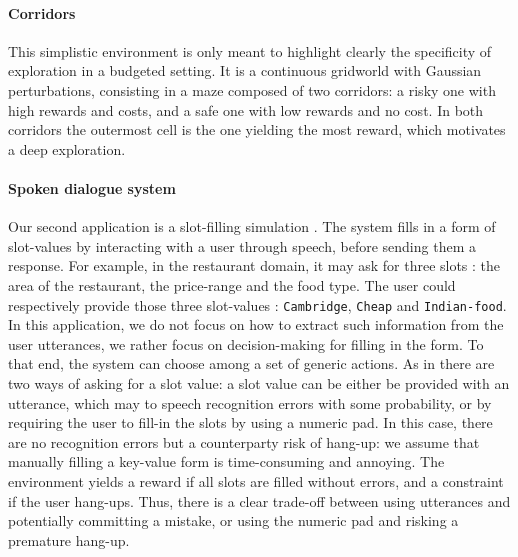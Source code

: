\documentclass{article}
\begin{document}
\paragraph{Corridors}
This simplistic environment is only meant to highlight clearly the specificity of exploration in a budgeted setting. It is a continuous gridworld with Gaussian perturbations, consisting in a maze composed of two corridors: a risky one with high rewards and costs, and a safe one with low rewards and no cost. In both corridors the outermost cell is the one yielding the most reward, which motivates a deep exploration.

\paragraph{Spoken dialogue system}
Our second application is a slot-filling simulation \citep{Li2009ReinforcementLF,chandramohan2010optimizing}. The system fills in a form of slot-values by interacting with a user through speech, before sending them a response. For example, in the restaurant domain, it may ask for three slots : the area of the restaurant, the price-range and the food type. The user could respectively provide those three slot-values : \texttt{Cambridge}, \texttt{Cheap} and \texttt{Indian-food}. In this application, we do not focus on how to extract such information from the user utterances, we rather focus on decision-making for filling in the form. To that end, the system can choose among a set of generic actions. As in \citep{carrara2018safe} there are two ways of asking for a slot value: a slot value can be either be provided with an utterance, which may to speech recognition errors with some probability, or by requiring the user to fill-in the slots by using a numeric pad. In this case, there are no recognition errors but a counterparty risk of hang-up: we assume that manually filling a key-value form is time-consuming and annoying. The environment yields a reward if all slots are filled without errors, and a constraint if the user hang-ups. Thus, there is a clear trade-off between using utterances and potentially committing a mistake, or using the numeric pad and risking a premature hang-up.
\end{document}
